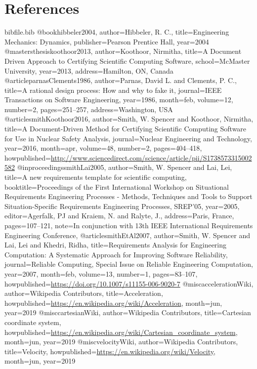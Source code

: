 \documentclass[12pt]{article}
\begin{document}
\section{References}
\label{Sec:References}
\begin{filecontents*}{bibfile.bib}
@book{hibbeler2004,
author={Hibbeler, R. C.},
title={Engineering Mechanics: Dynamics},
publisher={Pearson Prentice Hall},
year={2004}}
@mastersthesis{koothoor2013,
author={Koothoor, Nirmitha},
title={A Document Driven Approach to Certifying Scientific Computing Software},
school={McMaster University},
year={2013},
address={Hamilton, ON, Canada}}
@article{parnasClements1986,
author={Parnas, David L. and Clements, P. C.},
title={A rational design process: How and why to fake it},
journal={IEEE Transactions on Software Engineering},
year={1986},
month=feb,
volume={12},
number={2},
pages={251--257},
address={Washington, USA}}
@article{smithKoothoor2016,
author={Smith, W. Spencer and Koothoor, Nirmitha},
title={A Document-Driven Method for Certifying Scientific Computing Software for Use in Nuclear Safety Analysis},
journal={Nuclear Engineering and Technology},
year={2016},
month=apr,
volume={48},
number={2},
pages={404--418},
howpublished={\url{http://www.sciencedirect.com/science/article/pii/S1738573315002582}}}
@inproceedings{smithLai2005,
author={Smith, W. Spencer and Lai, Lei},
title={A new requirements template for scientific computing},
booktitle={Proceedings of the First International Workshop on Situational Requirements Engineering Processes - Methods, Techniques and Tools to Support Situation-Specific Requirements Engineering Processes, SREP'05},
year={2005},
editor={Agerfalk, PJ and Kraiem, N. and Ralyte, J.},
address={Paris, France},
pages={107--121},
note={In conjunction with 13th IEEE International Requirements Engineering Conference,}}
@article{smithEtAl2007,
author={Smith, W. Spencer and Lai, Lei and Khedri, Ridha},
title={Requirements Analysis for Engineering Computation: A Systematic Approach for Improving Software Reliability},
journal={Reliable Computing, Special Issue on Reliable Engineering Computation},
year={2007},
month=feb,
volume={13},
number={1},
pages={83--107},
howpublished={\url{https://doi.org/10.1007/s11155-006-9020-7}}}
@misc{accelerationWiki,
author={Wikipedia Contributors},
title={Acceleration},
howpublished={\url{https://en.wikipedia.org/wiki/Acceleration}},
month=jun,
year={2019}}
@misc{cartesianWiki,
author={Wikipedia Contributors},
title={Cartesian coordinate system},
howpublished={\url{https://en.wikipedia.org/wiki/Cartesian\_coordinate\_system}},
month=jun,
year={2019}}
@misc{velocityWiki,
author={Wikipedia Contributors},
title={Velocity},
howpublished={\url{https://en.wikipedia.org/wiki/Velocity}},
month=jun,
year={2019}}
\end{filecontents*}
\nocite{*}
\printbibliography[heading=none]
\end{document}
